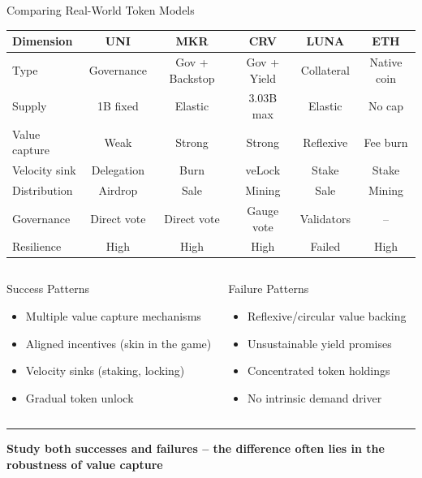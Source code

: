 \documentclass[8pt,aspectratio=169]{beamer}
\newcommand{\bottomnote}[1]{\vfill\vspace{-2mm}\textcolor{mllavender2}{\rule{\textwidth}{0.4pt}}\vspace{1mm}\footnotesize\textbf{#1}}
\begin{document}
\begin{frame}{Comparing Real-World Token Models}
\footnotesize
\begin{tabular}{lccccc}
\toprule
\textbf{Dimension} & \textbf{UNI} & \textbf{MKR} & \textbf{CRV} & \textbf{LUNA} & \textbf{ETH} \\
\midrule
Type & Governance & Gov + Backstop & Gov + Yield & Collateral & Native coin \\
Supply & 1B fixed & Elastic & 3.03B max & Elastic & No cap \\
Value capture & Weak & Strong & Strong & Reflexive & Fee burn \\
Velocity sink & Delegation & Burn & veLock & Stake & Stake \\
Distribution & Airdrop & Sale & Mining & Sale & Mining \\
Governance & Direct vote & Direct vote & Gauge vote & Validators & -- \\
Resilience & High & High & High & \textcolor{mlred}{Failed} & High \\
\bottomrule
\end{tabular}
\vspace{3mm}
\begin{columns}[T]
\begin{exampleblock}{\footnotesize Success Patterns}
\footnotesize
\begin{itemize}
  \item Multiple value capture mechanisms
  \item Aligned incentives (skin in the game)
  \item Velocity sinks (staking, locking)
  \item Gradual token unlock
\end{itemize}
\end{exampleblock}

\begin{alertblock}{\footnotesize Failure Patterns}
\footnotesize
\begin{itemize}
  \item Reflexive/circular value backing
  \item Unsustainable yield promises
  \item Concentrated token holdings
  \item No intrinsic demand driver
\end{itemize}
\end{alertblock}
\end{columns}
\bottomnote{Study both successes and failures -- the difference often lies in the robustness of value capture}
\end{frame}
\end{document}
